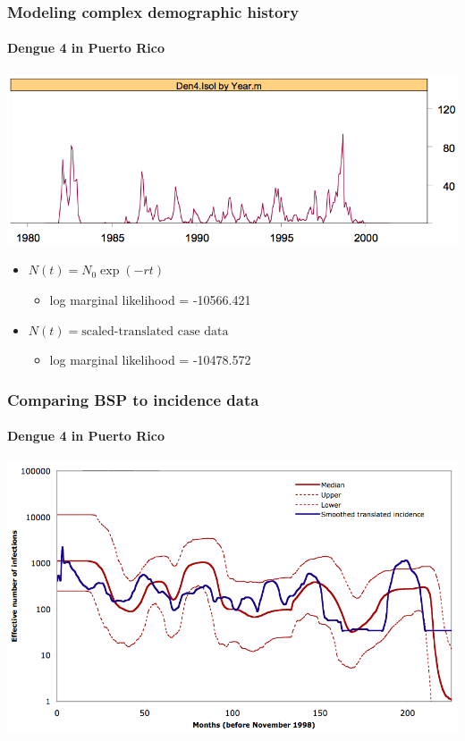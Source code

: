 \begin{frame}
\frametitle{Modeling complex demographic history}
\framesubtitle{Dengue 4 in Puerto Rico}
\begin{centering}%
\includegraphics[width=\textwidth]{../images/dengue4_isolatesByYear}%
\par%
\end{centering}%

\begin{itemize}
\item $N(t) = N_0\exp(-rt)$
  \begin{itemize}
  \item log marginal likelihood = -10566.421
  \end{itemize}
\item $N(t) = \mbox{scaled-translated case data}$
  \begin{itemize}
  \item log marginal likelihood = -10478.572
  \end{itemize}
\end{itemize}
\end{frame}

\begin{frame}
\frametitle{Comparing BSP to incidence data}
\framesubtitle{Dengue 4 in Puerto Rico}
\begin{centering}%
\includegraphics[width=\textwidth]{../images/dengue4_BSP}%
\par%
\end{centering}%
\end{frame}

